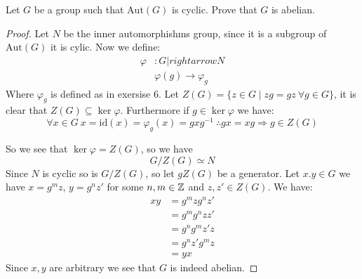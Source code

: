     \begin{exercise}
        Let $G$ be a group such that $\text{Aut}(G)$ is cyclic. Prove that $G$ is abelian.
        \begin{proof}
            Let $N$ be the inner automorphishms group, since it is a subgroup of $\text{Aut}(G)$ it is cylic. Now we define:\begin{align*}
                \varphi &\colon G|rightarrow N\\
                        &\varphi(g)\rightarrow \varphi_g
            \end{align*}
            Where $\varphi_g$ is defined as in exersise $6$. Let $Z(G) = \{z\in G \mid zg = gz \ \forall g\in G\}$, it is clear that $Z(G)\subseteq \ker \varphi$. Furthermore if $g\in \ker\varphi$ we have:\begin{equation*}
                \forall x\in G \ x = \text{id}(x) = \varphi_g(x) = gxg^{-1} \ \therefore gx = xg \Rightarrow g\in Z(G)
            \end{equation*}

            So we see that $\ker\varphi = Z(G)$, so we have \[G/Z(G)\simeq N\]
            Since $N$ is cyclic so is $G/Z(G)$, so let $gZ(G)$ be a generator. Let $x.y\in G$ we have $x = {g^m}z$, $y = {g^n}z'$ for some $n,m\in \mathbb{Z}$ and $z,z'\in Z(G)$. We have:\begin{align*}
                xy &= {g^m}z{g^n}z'\\
                    &= {g^m}{g^n}zz'\\
                    &= {g^n}{g^m}z'z\\
                    &=  {g^n}z'{g^m}z\\
                    &= yx
            \end{align*}
            Since $x,y$ are arbitrary we see that $G$ is indeed abelian.
        \end{proof}
    \end{exercise}

